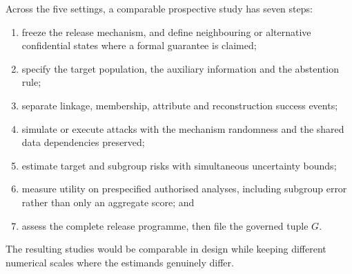\documentclass[11pt,a4paper]{article}
\theoremstyle{plain}
\theoremstyle{definition}
\begin{document}
Across the five settings, a comparable prospective study has seven steps:

\begin{enumerate}
\item freeze the release mechanism, and define neighbouring or alternative
confidential states where a formal guarantee is claimed;
\item specify the target population, the auxiliary information and the abstention
rule;
\item separate linkage, membership, attribute and reconstruction success events;
\item simulate or execute attacks with the mechanism randomness and the shared
data dependencies preserved;
\item estimate target and subgroup risks with simultaneous uncertainty bounds;
\item measure utility on prespecified authorised analyses, including subgroup
error rather than only an aggregate score; and
\item assess the complete release programme, then file the governed tuple $G$.
\end{enumerate}

The resulting studies would be comparable in design while keeping different
numerical scales where the estimands genuinely differ.







\def\publicsearchtable{generated/table_public_search}
\def\publicsearchllmtable{generated/table_public_search_llm}

\end{document}
